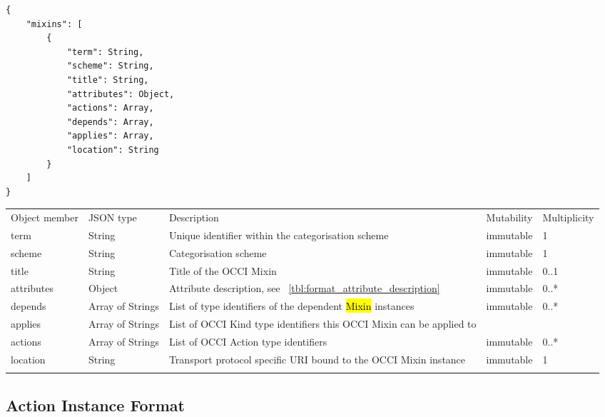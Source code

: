 \documentclass[10pt,a4paper]{article}
\begin{document}
\begin{lstlisting}
{
    "mixins": [
        {
            "term": String,
            "scheme": String,
            "title": String,
            "attributes": Object,
            "actions": Array,
            "depends": Array,
            "applies": Array,
            "location": String
        }
    ]
}
\end{lstlisting}

 {
    \begin{tabularx}{\textwidth}{llXll}
    \toprule
    Object member & JSON type & Description & Mutability & Multiplicity \\
    \colrule
    term & String & Unique identifier within the categorisation scheme &
immutable & 1 \\

    scheme & String & Categorisation scheme & immutable & 1 \\
    
    title & String & Title of the OCCI Mixin & immutable & 0..1 \\
    
    attributes & Object & Attribute description, see
~\ref{tbl:format_attribute_description} & immutable & 0..* \\

    depends & Array of Strings & List of type identifiers of the dependent
 \hl{Mixin} instances & immutable & 0..* \\
 
    applies & Array of Strings & List of OCCI Kind type identifiers this OCCI 
Mixin can be applied to \\

    actions & Array of Strings & List of OCCI Action type identifiers
& immutable & 0..* \\

    location & String & Transport protocol specific URI bound to the OCCI Mixin
instance & immutable & 1 \\
    \botrule
    \end{tabularx}
}

\subsection{Action Instance Format}
\label{sec:format_action}
\end{document}
